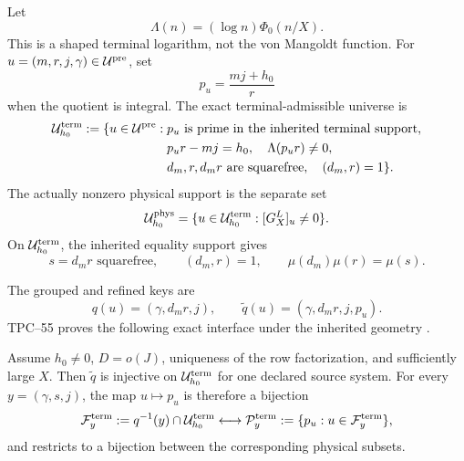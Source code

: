 Let
\begin{equation}
 \Lambda(n)=(\log n)\Phi_0(n/X).
 \label{eq:tpc56-shaped-terminal-weight}
\end{equation}
This is a shaped terminal logarithm, not the von Mangoldt function.  For
\(u=(m,r,j,\gamma)\in\mathcal U^{\rm pre}\), set
\begin{equation}
 p_u=\frac{mj+h_0}{r}
 \label{eq:tpc56-terminal-candidate}
\end{equation}
when the quotient is integral.  The exact terminal-admissible universe is
\begin{equation}
 \begin{split}
 \mathcal U_{h_0}^{\rm term}:=\{u\in\mathcal U^{\rm pre}:{}&
 p_u\text{ is prime in the inherited terminal support},\\
 &p_ur-mj=h_0,\quad \Lambda(p_ur)\ne0,\\
 &d_m,r,d_mr\text{ are squarefree},\quad(d_m,r)=1\}.
 \end{split}
 \label{eq:tpc56-terminal-universe}
\end{equation}
The actually nonzero physical support is the separate set
\begin{equation}
 \mathcal U_{h_0}^{\rm phys}
 =\{u\in\mathcal U_{h_0}^{\rm term}:[G_X^L]_u\ne0\}.
 \label{eq:tpc56-physical-universe}
\end{equation}
On \(\mathcal U_{h_0}^{\rm term}\), the inherited equality support gives
\begin{equation}
 s=d_mr\text{ squarefree},\qquad(d_m,r)=1,\qquad
 \mu(d_m)\mu(r)=\mu(s).
 \label{eq:tpc56-common-mobius-identity}
\end{equation}

The grouped and refined keys are
\begin{equation}
 q(u)=(\gamma,d_mr,j),
 \qquad
 \widetilde q(u)=(\gamma,d_mr,j,p_u).
 \label{eq:tpc56-two-keys}
\end{equation}
TPC--55 proves the following exact interface under the inherited geometry
\citep{WangTPC55}.

\begin{proposition}
\label{prop:tpc56-prime-resolved-bijection}
Assume \(h_0\ne0\), \(D=o(J)\), uniqueness of the row factorization, and
sufficiently large \(X\).  Then \(\widetilde q\) is injective on
\(\mathcal U_{h_0}^{\rm term}\) for one declared source system.  For every
\(y=(\gamma,s,j)\), the map \(u\mapsto p_u\) is therefore a bijection
\begin{equation}
 \mathcal F_y^{\rm term}
 :=q^{-1}(y)\cap\mathcal U_{h_0}^{\rm term}
 \longleftrightarrow
 \mathcal P_y^{\rm term}:=\{p_u:u\in\mathcal F_y^{\rm term}\},
 \label{eq:tpc56-terminal-prime-bijection}
\end{equation}
and restricts to a bijection between the corresponding physical subsets.
\end{proposition}

